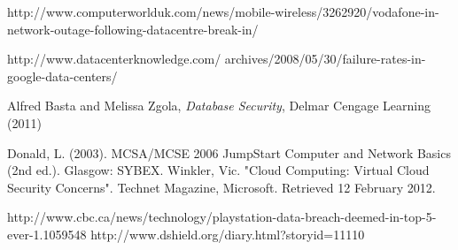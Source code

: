 \documentclass[11pt, twocolumn]{article}
\begin{document}
\begin{thebibliography}{}
  http://www.computerworlduk.com/news/mobile-wireless/3262920/vodafone-in-network-outage-following-datacentre-break-in/

  http://www.datacenterknowledge.com/ archives/2008/05/30/failure-rates-in-google-data-centers/

  Alfred Basta and Melissa Zgola, {\it Database Security}, Delmar Cengage Learning (2011)

 Donald, L. (2003). MCSA/MCSE 2006 JumpStart Computer and Network Basics (2nd ed.). Glasgow: SYBEX.
 Winkler, Vic. "Cloud Computing: Virtual Cloud Security Concerns". Technet Magazine, Microsoft. Retrieved 12 February 2012.

 http://www.cbc.ca/news/technology/playstation-data-breach-deemed-in-top-5-ever-1.1059548
 http://www.dshield.org/diary.html?storyid=11110

\end{thebibliography}
\end{document}
